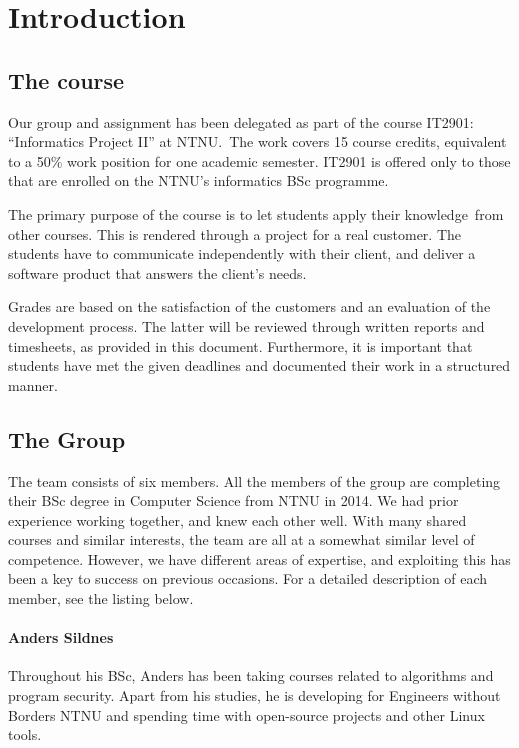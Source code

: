 \chapter{Introduction}
\section{The course}
Our group and assignment has been delegated as part of the course
IT2901: ``Informatics Project II''
at NTNU.\ The work covers 15 course credits, equivalent to a 50\% work
position for one academic semester. IT2901 is offered only to those
that are enrolled on the NTNU's informatics BSc
programme.

The primary purpose of the course is to let students apply their
knowledge\ from other courses. This is rendered through a project for a
real customer. The students have to communicate independently with
their client, and deliver a software product that answers the
client's needs. 

Grades are based on the satisfaction of the customers and an evaluation
of the development process. The latter will be reviewed through written
reports and timesheets, as provided in this document. Furthermore, it
is important that students have met the given deadlines and documented
their work in a structured manner.

\section{The Group}

The team consists of six members. All the members of the group are
completing their BSc degree in Computer Science from NTNU in 2014. We
had prior experience working together, and knew each other well. With
many shared courses and similar interests, the team are all at a
somewhat similar level of competence. However, we have different areas
of expertise, and exploiting this has been a key to success on previous
occasions. For a detailed description of each member, see the listing
below.

\subsubsection*{Anders Sildnes}
Throughout his BSc, Anders has been taking courses related to algorithms
and program security. Apart from his studies, he is developing for
Engineers without Borders NTNU and spending time with open-source
projects and other Linux tools.

